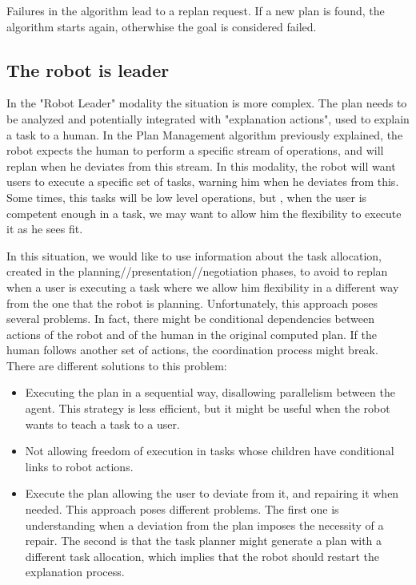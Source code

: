 Failures in the algorithm lead to a replan request. If a new plan is found, the algorithm starts again, otherwhise the goal is considered failed.

\subsection{The robot is leader}

In the "Robot Leader" modality the situation is more complex. The plan needs to be analyzed and potentially integrated with "explanation actions", used to explain a task to a human. In the Plan Management algorithm previously explained, the robot expects the human to perform a specific stream of operations, and will replan when he deviates from this stream. In this modality, the robot will want users to execute a specific set of tasks, warning him when he deviates from this. Some times, this tasks will be low level operations, but , when the user is competent enough in a task,  we may want to allow him the flexibility to execute it as he sees fit. 

In this situation, we would like to use information about the task allocation, created in the planning//presentation//negotiation phases, to avoid to replan when a user is executing a task where we allow him flexibility in a different way from the one that the robot is planning.  Unfortunately, this approach poses several problems. In fact, there might be conditional dependencies between actions of the robot and of the human in the original computed plan. If the human follows another set of actions, the coordination process might break. There are different solutions to this problem:
\begin{itemize}
	\item Executing the plan in a sequential way, disallowing parallelism between the agent. This strategy is less efficient, but it might be useful when the robot wants to teach a task to a user.
	\item Not allowing freedom of execution in tasks whose children have conditional links to robot actions. 
	\item Execute the plan allowing the user to deviate from it, and repairing it when needed. This approach poses different problems. The first one is understanding when a deviation from the plan imposes the necessity of a repair. The second is that the task planner might generate a plan with a different task allocation, which implies that the robot should restart the explanation process.
\end{itemize}


